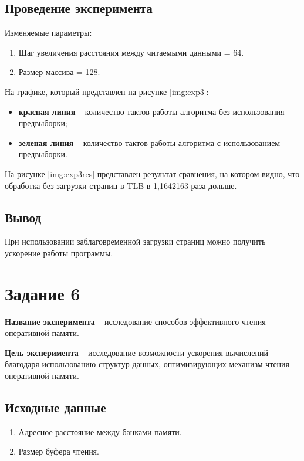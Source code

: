 \subsection{Проведение эксперимента}

Изменяемые параметры:
\begin{enumerate}
	\item Шаг увеличения расстояния между читаемыми данными = 64.
	\item Размер массива = 128.
\end{enumerate}

На графике, который представлен на рисунке \ref{img:exp3}:
\begin{itemize}
    \item \textbf{красная линия} -- количество тактов работы алгоритма без
          использования предвыборки;
    \item \textbf{зеленая линия} -- количество тактов работы алгоритма с
          использованием предвыборки.
\end{itemize}



На рисунке \ref{img:exp3res} представлен результат сравнения, на котором видно,
что обработка без загрузки страниц в TLB в 1,1642163 раза дольше.

\subsection{Вывод}

При использовании заблаговременной загрузки страниц можно получить ускорение
работы программы.

\section{Задание 6}
\textbf{Название эксперимента} -- исследование способов эффективного чтения
оперативной памяти.

\textbf{Цель эксперимента} -- исследование возможности ускорения вычислений
благодаря использованию структур данных, оптимизирующих механизм чтения
оперативной памяти.

\subsection{Исходные данные}
\begin{enumerate}
	\item Адресное расстояние между банками памяти.
	\item Размер буфера чтения.
\end{enumerate}

